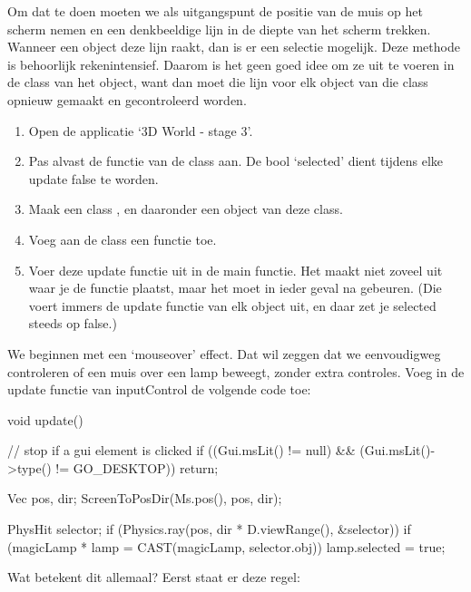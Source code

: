 Om dat te doen moeten we als uitgangspunt de positie van de muis op het scherm nemen en een denkbeeldige lijn in de diepte van het scherm trekken. Wanneer een object deze lijn raakt, dan is er een selectie mogelijk. Deze methode is behoorlijk rekenintensief. Daarom is het geen goed idee om ze uit te voeren in de class van het object, want dan moet die lijn voor elk object van die class opnieuw gemaakt en gecontroleerd worden.

\begin{exercise}
\begin{enumerate}
	\item Open de applicatie `3D World - stage 3'. 
	\item Pas alvast de functie  van de class  aan. De bool `selected' dient tijdens elke update false te worden.
	\item Maak een class , en daaronder een object van deze class.
	\item Voeg aan de class een functie  toe.
	\item Voer deze update functie uit in de main  functie. Het maakt niet zoveel uit waar je de functie plaatst, maar het moet in ieder geval na  gebeuren. (Die voert immers de update functie van elk object uit, en daar zet je selected steeds op false.)
\end{enumerate}
\end{exercise}

We beginnen met een `mouseover' effect. Dat wil zeggen dat we eenvoudigweg controleren of een muis over een lamp beweegt, zonder extra controles. Voeg in de update functie van inputControl de volgende code toe:

\begin{code}
   void update()
   {      
      // stop if a gui element is clicked
      if ((Gui.msLit() != null) && (Gui.msLit()->type() != GO_DESKTOP)) return;

      Vec pos, dir;      
      ScreenToPosDir(Ms.pos(), pos, dir);
			
      PhysHit selector;      
      if (Physics.ray(pos, dir * D.viewRange(), &selector))
      {
         if (magicLamp * lamp = CAST(magicLamp, selector.obj))
         {
            lamp.selected = true;
         }
      }
      
   }
\end{code}

Wat betekent dit allemaal? Eerst staat er deze regel:

